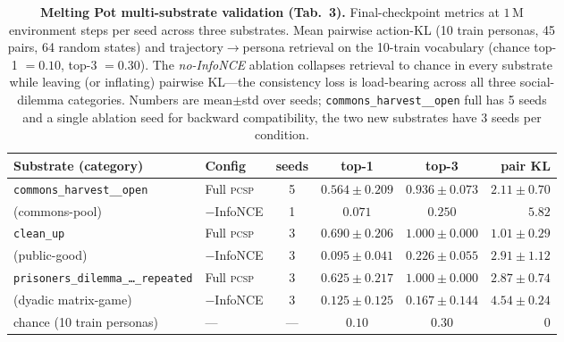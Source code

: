 \documentclass[conference]{IEEEtran}
\newcommand{\PCSP}{\textsc{pcsp}\xspace}
\begin{document}
\begin{table}[t]
  \centering
  \small
  \caption{%
    \textbf{Melting Pot multi-substrate validation (Tab.~3).} Final-checkpoint
    metrics at $1\,\text{M}$ environment steps per seed across three substrates.
    Mean pairwise action-KL (10 train personas, 45 pairs, 64 random states)
    and trajectory$\to$persona retrieval on the 10-train vocabulary
    (chance top-1 $\!=\!0.10$, top-3 $\!=\!0.30$).
    The \emph{no-InfoNCE} ablation collapses retrieval to chance in every
    substrate while leaving (or inflating) pairwise KL---the consistency loss
    is load-bearing across all three social-dilemma categories.
    Numbers are mean$\pm$std over seeds; \texttt{commons\_harvest\_\_open}
    full has 5 seeds and a single ablation seed for backward compatibility,
    the two new substrates have 3 seeds per condition.}
  \label{tab:mp_multi}
  \setlength{\tabcolsep}{5pt}
  \begin{tabularx}{\textwidth}{>{\raggedright\arraybackslash}X l c c c r}
    \toprule
    Substrate (category) & Config & seeds & top-1 & top-3 & pair KL \\
    \midrule
    \texttt{commons\_harvest\_\_open}  & Full \PCSP                & 5 & $0.564\!\pm\!0.209$ & $0.936\!\pm\!0.073$ & $2.11\!\pm\!0.70$ \\
    (commons-pool)                      & $-\!$InfoNCE              & 1 & $0.071$            & $0.250$            & $5.82$            \\
    \midrule
    \texttt{clean\_up}                  & Full \PCSP                & 3 & $\mathbf{0.690\!\pm\!0.206}$ & $\mathbf{1.000\!\pm\!0.000}$ & $1.01\!\pm\!0.29$ \\
    (public-good)                       & $-\!$InfoNCE              & 3 & $0.095\!\pm\!0.041$ & $0.226\!\pm\!0.055$ & $2.91\!\pm\!1.12$ \\
    \midrule
    \texttt{prisoners\_dilemma\_\dots\_repeated} & Full \PCSP       & 3 & $\mathbf{0.625\!\pm\!0.217}$ & $\mathbf{1.000\!\pm\!0.000}$ & $2.87\!\pm\!0.74$ \\
    (dyadic matrix-game)               & $-\!$InfoNCE              & 3 & $0.125\!\pm\!0.125$ & $0.167\!\pm\!0.144$ & $4.54\!\pm\!0.24$ \\
    \midrule
    chance (10 train personas)         & ---                       & --- & $0.10$ & $0.30$ & $0$ \\
    \bottomrule
  \end{tabularx}
\end{table}
\end{document}
